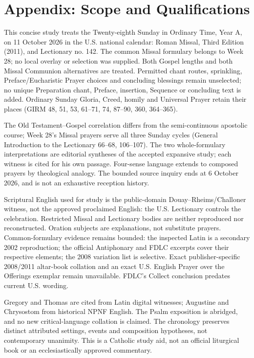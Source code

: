 \section{Appendix: Scope and Qualifications}
This concise study treats the Twenty-eighth Sunday in Ordinary Time, Year A, on 11 October 2026 in the U.S. national calendar: Roman Missal, Third Edition (2011), and Lectionary no. 142. The common Missal formulary belongs to Week 28; no local overlay or selection was supplied. Both Gospel lengths and both Missal Communion alternatives are treated. Permitted chant routes, sprinkling, Preface/Eucharistic Prayer choices and concluding blessings remain unselected; no unique Preparation chant, Preface, insertion, Sequence or concluding text is added. Ordinary Sunday Gloria, Creed, homily and Universal Prayer retain their places (GIRM 48, 51, 53, 61--71, 74, 87--90, 360, 364--365).

The Old Testament--Gospel correlation differs from the semi-continuous apostolic course; Week 28's Missal prayers serve all three Sunday cycles (General Introduction to the Lectionary 66--68, 106--107). The two whole-formulary interpretations are editorial syntheses of the accepted expansive study; each witness is cited for his own passage. Four-sense language extends to composed prayers by theological analogy. The bounded source inquiry ends at 6 October 2026, and is not an exhaustive reception history.

Scriptural English used for study is the public-domain Douay--Rheims/Challoner witness, not the approved proclaimed English: the U.S. Lectionary controls the celebration. Restricted Missal and Lectionary bodies are neither reproduced nor reconstructed. Oration subjects are explanations, not substitute prayers. Common-formulary evidence remains bounded: the inspected Latin is a secondary 2002 reproduction; the official Antiphonary and FDLC excerpts cover their respective elements; the 2008 variation list is selective. Exact publisher-specific 2008/2011 altar-book collation and an exact U.S. English Prayer over the Offerings exemplar remain unavailable. FDLC's Collect conclusion predates current U.S. wording.

Gregory and Thomas are cited from Latin digital witnesses; Augustine and Chrysostom from historical NPNF English. The Psalm exposition is abridged, and no new critical-language collation is claimed. The chronology preserves distinct attributed settings, events and composition hypotheses, not contemporary unanimity. This is a Catholic study aid, not an official liturgical book or an ecclesiastically approved commentary.

